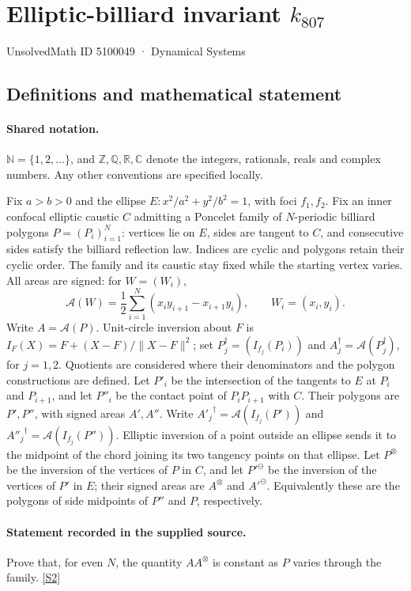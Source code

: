 \documentclass[11pt]{article}
\newcommand{\sref}[2]{\hyperlink{source:#1:#2}{[S#2]}}
\begin{document}
\setcounter{section}{5100048}
\section{Elliptic-billiard invariant $k_{807}$}\label{5100049}
{\small\sffamily UnsolvedMath ID 5100049 · Dynamical Systems}
\subsection{Definitions and mathematical statement}

\paragraph{Shared notation.}$\mathbb N=\{1,2,\ldots\}$, and $\mathbb Z,\mathbb Q,\mathbb R,\mathbb C$ denote the integers, rationals, reals and complex numbers. Any other conventions are specified locally.


Fix $a>b>0$ and the ellipse $E:x^2/a^2+y^2/b^2=1$, with foci $f_1,f_2$. Fix an inner confocal elliptic caustic $C$ admitting a Poncelet family of $N$-periodic billiard polygons $P=(P_i)_{i=1}^N$: vertices lie on $E$, sides are tangent to $C$, and consecutive sides satisfy the billiard reflection law. Indices are cyclic and polygons retain their cyclic order. The family and its caustic stay fixed while the starting vertex varies. All areas are signed: for $W=(W_i)$,
\[\mathcal A(W)=\frac12\sum_{i=1}^N(x_i y_{i+1}-x_{i+1}y_i),\qquad W_i=(x_i,y_i).\]
Write $A=\mathcal A(P)$. Unit-circle inversion about $F$ is $I_F(X)=F+(X-F)/\lVert X-F\rVert^2$; set $P_j^\dagger=(I_{f_j}(P_i))$ and $A_j^\dagger=\mathcal A(P_j^\dagger)$, for $j=1,2$. Quotients are considered where their denominators and the polygon constructions are defined. Let $P'_i$ be the intersection of the tangents to $E$ at $P_i$ and $P_{i+1}$, and let $P''_i$ be the contact point of $P_iP_{i+1}$ with $C$. Their polygons are $P',P''$, with signed areas $A',A''$. Write ${A'_j}^\dagger=\mathcal A(I_{f_j}(P'))$ and ${A''_j}^\dagger=\mathcal A(I_{f_j}(P''))$. Elliptic inversion of a point outside an ellipse sends it to the midpoint of the chord joining its two tangency points on that ellipse. Let $P^\otimes$ be the inversion of the vertices of $P$ in $C$, and let ${P'}^\ominus$ be the inversion of the vertices of $P'$ in $E$; their signed areas are $A^\otimes$ and ${A'}^\ominus$. Equivalently these are the polygons of side midpoints of $P''$ and $P$, respectively.
\paragraph{Statement recorded in the supplied source.}
Prove that, for even $N$, the quantity $AA^\otimes$ is constant as $P$ varies through the family. \sref{5100049}{2}
\end{document}
